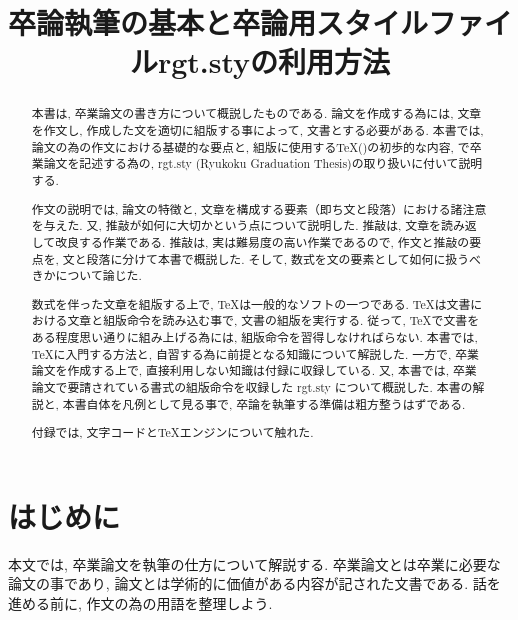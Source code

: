 \documentclass[12pt,xelatex,ja=standard]{bxjsarticle}
\begin{document}
\title{卒論執筆の基本と卒論用スタイルファイルrgt.styの利用方法}

\begin{abstract}
本書は,
卒業論文の書き方について概説したものである.
論文を作成する為には,
文章を作文し, 作成した文を適切に組版する事によって,
文書とする必要がある.
本書では,
論文の為の作文における基礎的な要点と,
組版に使用する\TeX (\XeLaTeX )の初歩的な内容,
\XeLaTeX で卒業論文を記述する為の,
rgt.sty (Ryukoku Graduation Thesis)の取り扱いに付いて説明する.

作文の説明では,
論文の特徴と,
文章を構成する要素（即ち文と段落）における諸注意を与えた.
又, 推敲が如何に大切かという点について説明した.
推敲は, 文章を読み返して改良する作業である.
推敲は, 実は難易度の高い作業であるので,
作文と推敲の要点を,
文と段落に分けて本書で概説した.
そして, 数式を文の要素として如何に扱うべきかについて論じた.

数式を伴った文章を組版する上で,
\TeX は一般的なソフトの一つである.
\TeX は文書における文章と組版命令を読み込む事で,
文書の組版を実行する.
従って,
\TeX で文書をある程度思い通りに組み上げる為には,
組版命令を習得しなければらない.
本書では,
\TeX に入門する方法と,
自習する為に前提となる知識について解説した.
一方で,
卒業論文を作成する上で, 直接利用しない知識は付録に収録している.
又,
本書では,
卒業論文で要請されている書式の組版命令を収録した
rgt.sty について概説した.
本書の解説と,
本書自体を凡例として見る事で,
卒論を執筆する準備は粗方整うはずである.

付録では,
文字コードと\TeX エンジンについて触れた.

\end{abstract}

\maketitle

\Mokuji

\section{はじめに}
本文では, 卒業論文を執筆の仕方について解説する.
卒業論文とは卒業に必要な論文の事であり,
論文とは学術的に価値がある内容が記された文書である.
話を進める前に, 作文の為の用語を整理しよう.
\end{document}
